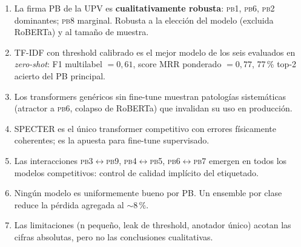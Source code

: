 \documentclass[11pt,a4paper]{article}
\newcommand{\pb}[1]{\textsc{pb#1}}
\begin{document}
\begin{enumerate}
\item La firma PB de la UPV es \textbf{cualitativamente robusta}: \pb1, \pb6, \pb2 dominantes; \pb8 marginal. Robusta a la elección del modelo (excluida RoBERTa) y al tamaño de muestra.
\item TF-IDF con threshold calibrado es el mejor modelo de los seis evaluados en \emph{zero-shot}: F1 multilabel $=0{,}61$, score MRR ponderado $=0{,}77$, 77\,\% top-2 acierto del PB principal.
\item Los transformers genéricos sin fine-tune muestran patologías sistemáticas (atractor a \pb6, colapso de RoBERTa) que invalidan su uso en producción.
\item SPECTER es el único transformer competitivo con errores físicamente coherentes; es la apuesta para fine-tune supervisado.
\item Las interacciones \pb3$\leftrightarrow$\pb9, \pb4$\leftrightarrow$\pb5, \pb6$\leftrightarrow$\pb7 emergen en todos los modelos competitivos: control de calidad implícito del etiquetado.
\item Ningún modelo es uniformemente bueno por PB. Un ensemble por clase reduce la pérdida agregada al $\sim 8\,\%$.
\item Las limitaciones (n pequeño, leak de threshold, anotador único) acotan las cifras absolutas, pero no las conclusiones cualitativas.
\end{enumerate}
\end{document}
